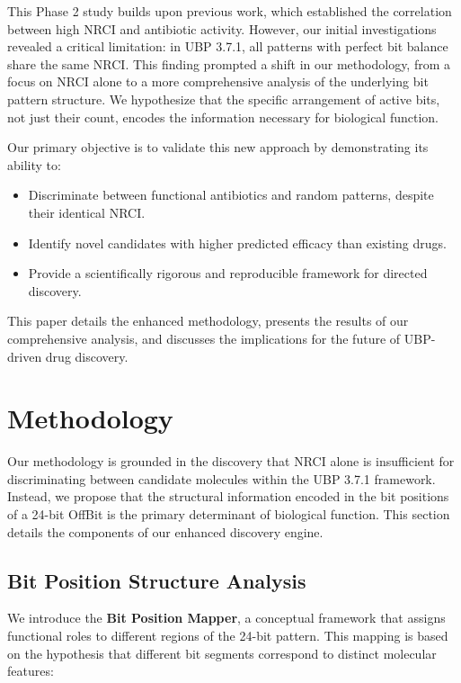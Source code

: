 \documentclass[12pt, a4paper]{article}
\begin{document}
This Phase 2 study builds upon previous work, which established the correlation between high NRCI and antibiotic activity. However, our initial investigations revealed a critical limitation: in UBP 3.7.1, all patterns with perfect bit balance share the same NRCI. This finding prompted a shift in our methodology, from a focus on NRCI alone to a more comprehensive analysis of the underlying bit pattern structure. We hypothesize that the specific arrangement of active bits, not just their count, encodes the information necessary for biological function.

Our primary objective is to validate this new approach by demonstrating its ability to:
\begin{itemize}
    \item Discriminate between functional antibiotics and random patterns, despite their identical NRCI.
    \item Identify novel candidates with higher predicted efficacy than existing drugs.
    \item Provide a scientifically rigorous and reproducible framework for directed discovery.
\end{itemize}

This paper details the enhanced methodology, presents the results of our comprehensive analysis, and discusses the implications for the future of UBP-driven drug discovery.
\section{Methodology}

Our methodology is grounded in the discovery that NRCI alone is insufficient for discriminating between candidate molecules within the UBP 3.7.1 framework. Instead, we propose that the structural information encoded in the bit positions of a 24-bit OffBit is the primary determinant of biological function. This section details the components of our enhanced discovery engine.

\subsection{Bit Position Structure Analysis}

We introduce the \textbf{Bit Position Mapper}, a conceptual framework that assigns functional roles to different regions of the 24-bit pattern. This mapping is based on the hypothesis that different bit segments correspond to distinct molecular features:
\end{document}
